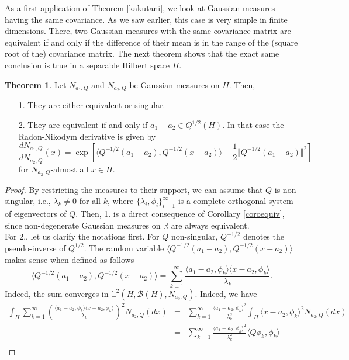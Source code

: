 \documentclass[10pt, a4paper]{report}
\newcommand{\Ll}[0]{\mathbb{L}}
\newcommand{\R}[0]{\mathbb{R}}
\theoremstyle{definition}
\newtheorem{theorem}{Theorem}
\theoremstyle{remark}
\begin{document}
As a first application of Theorem \ref{kakutani}, we look at Gaussian measures having the same covariance. As we saw earlier, this case is very simple in finite dimensions. There, two Gaussian measures with the same covariance matrix are equivalent if and only if the difference of their mean is in the range of the (square root of the) covariance matrix. The next theorem shows that the exact same conclusion is true in a separable Hilbert space $H$.
\begin{theorem}\label{radnikgauss}
	Let $N_{a_1,Q}$ and  $N_{a_2,Q}$ be Gaussian measures on $H$. Then,
	\begin{itemize}
		\item[1.] They are either equivalent or singular.
		\item[2.] They are equivalent if and only if $a_1-a_2 \in Q^{1/2}(H)$. In that case the Radon-Nikodym derivative is given by 
		$$\frac{dN_{a_1,Q}}{dN_{a_2,Q}}(x) = \exp\left[\langle Q^{-1/2}(a_1-a_2),Q^{-1/2}(x-a_2)\rangle - \frac{1}{2} \Vert Q^{-1/2}(a_1-a_2)\Vert^2 \right]$$
		for $N_{a_2,Q}$-almost all $x \in H$.
	\end{itemize}
	\begin{proof}
		By restricting the measures to their support, we can assume that $Q$ is non-singular, i.e., $\lambda_k \ne 0$ for all $k$, where $\{\lambda_i, \phi_i \}_{i=1}^\infty$ is a complete orthogonal system of eigenvectors of $Q$. Then, 1. is a direct consequence of Corollary \ref{coroequiv}, since non-degenerate Gaussian measures on $\R$ are always equivalent.\\
		For 2., let us clarify the notations first. For $Q$ non-singular, $Q^{-1/2}$ denotes the pseudo-inverse of $Q^{1/2}$. The random variable $\langle Q^{-1/2}(a_1-a_2),Q^{-1/2}(x-a_2)\rangle$ makes sense when defined as follows
		$$\langle Q^{-1/2}(a_1-a_2),Q^{-1/2}(x-a_2)\rangle = \sum_{k=1}^{\infty} \frac{\langle a_1-a_2,\phi_k\rangle\langle x-a_2,\phi_k\rangle}{\lambda_k}.$$
		Indeed, the sum converges in $\Ll^2(H,\mathcal{B}(H),N_{a_2,Q})$. Indeed, we have 
		\begin{eqnarray*}
			\int_H \sum_{k=1}^{\infty} \left(\frac{\langle a_1-a_2,\phi_k\rangle\langle x-a_2,\phi_k\rangle}{\lambda_k}\right)^2 N_{a_2,Q}(dx) & = & \sum_{k=1}^{\infty} \frac{\langle a_1-a_2,\phi_k\rangle^2}{\lambda_k^2}\int_H \langle x-a_2,\phi_k\rangle^2 N_{a_2,Q}(dx) \\
			& = & \sum_{k=1}^{\infty} \frac{\langle a_1-a_2,\phi_k\rangle^2}{\lambda_k^2} \langle Q\phi_k,\phi_k \rangle \\

\end{eqnarray*}
\end{proof}
\end{theorem}
\end{document}
